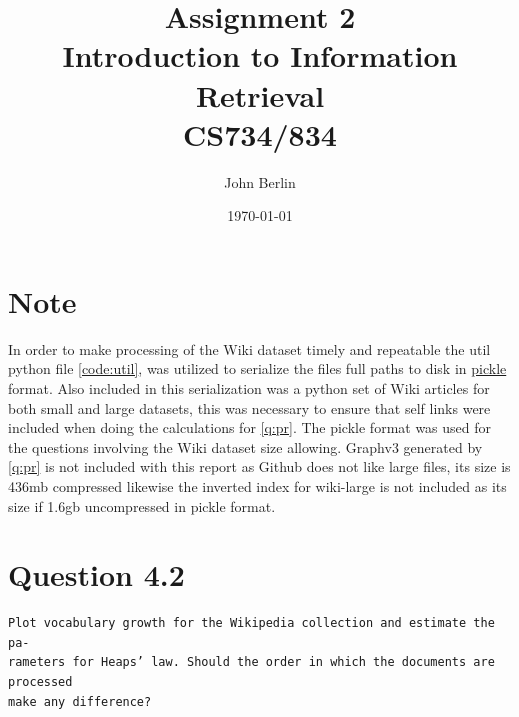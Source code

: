 \documentclass[11pt]{article}
\title{Assignment 2 \\ Introduction to Information Retrieval \\ CS734/834}
\author{John Berlin}
\date{\today}
\begin{document}
\maketitle
\newpage
\section*{Note}
In order to make processing of the Wiki dataset timely and repeatable the util python file \autoref{code:util}, was utilized to serialize the files full paths to disk in \href{https://docs.python.org/3/library/pickle.html}{pickle} format. Also included in this serialization was a python set of Wiki articles for both small and large datasets, this was necessary to ensure that self links were included when doing the calculations for \autoref{q:pr}. The pickle format was used for the questions involving the Wiki dataset size allowing. Graphv3 generated by \autoref{q:pr} is not included with this report as Github does not like large files, its size is 436mb compressed likewise the inverted index for wiki-large is not included as its size if 1.6gb uncompressed in pickle format. 

\section{Question 4.2}
\begin{verbatim}
Plot vocabulary growth for the Wikipedia collection and estimate the pa-
rameters for Heaps’ law. Should the order in which the documents are processed
make any difference?
\end{verbatim}
\end{document}
